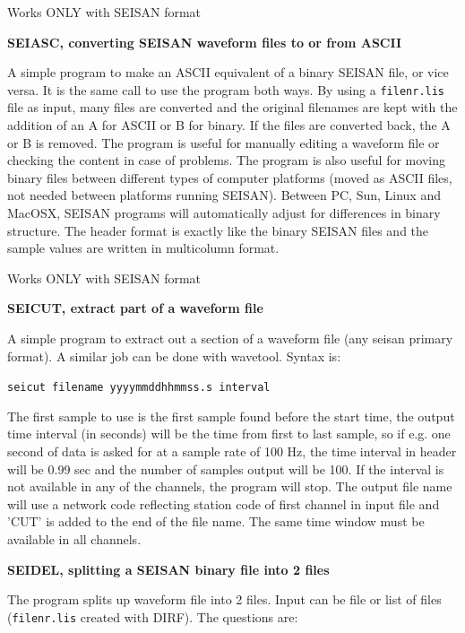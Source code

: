 Works ONLY with SEISAN format 

\textbf{SEIASC, converting SEISAN waveform files to or from ASCII}

A simple program to make an ASCII equivalent of a binary SEISAN file, 
or vice versa. It is the same call to use the program both ways. 
By using a \texttt{filenr.lis} file as input, many files are converted 
and the original filenames are kept with the addition of an A for 
ASCII or B for binary.  If the files are converted back, the A or 
B is removed. \newline
The program is useful for manually editing a waveform file or checking the content in case of problems. The program is also useful for moving binary files between different types of computer platforms (moved as ASCII files, not needed between platforms running SEISAN). Between PC, Sun, Linux and MacOSX, SEISAN programs will automatically adjust for differences in binary structure. The header format is exactly like the binary SEISAN files and the sample values are written in multicolumn format. 

Works ONLY with SEISAN format 

\textbf{SEICUT, extract part of a waveform file}

A simple program to extract out a section of a waveform file (any seisan primary format). A similar job can be done with wavetool. Syntax is: 

\texttt{seicut filename yyyymmddhhmmss.s interval}

The first sample to use is the first sample found before the start time, the output time interval (in seconds) will be the time from first to last sample, so if e.g. one second of data is asked for at a sample rate of 100 Hz, the time interval in header will be 0.99 sec and the number of samples output will be 100. If the interval is not available in any of the channels, the program will stop. The output file name will use a network code reflecting station code of first channel in input file and 'CUT' is added to the end of the file name.  The same time window must be available in all channels. 

\textbf{SEIDEL, splitting a SEISAN binary file into 2 files}

The program splits up waveform file into 2 files. Input can be file or list of files (\texttt{filenr.lis} created with DIRF). The questions are: 


